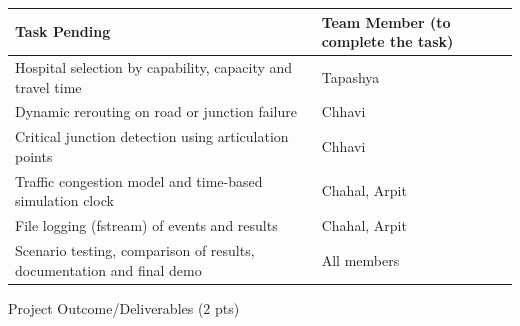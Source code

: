 \documentclass[
]{article}
\newcounter{none} %
\begin{document}
{\def\LTcaptype{none} %
\begin{longtable}[]{@{}
  >{\raggedright\arraybackslash}p{}
  >{\raggedright\arraybackslash}p{}@{}}
\toprule\noalign{}
\begin{minipage}[b]{\linewidth}\raggedright
\textbf{Task Pending}
\end{minipage} & \begin{minipage}[b]{\linewidth}\raggedright
\textbf{Team Member (to complete the task)}
\end{minipage} \\
\midrule\noalign{}
\endhead
\bottomrule\noalign{}
\endlastfoot
Hospital selection by capability, capacity and travel time & Tapashya \\
Dynamic rerouting on road or junction failure & Chhavi \\
Critical junction detection using articulation points & Chhavi \\
Traffic congestion model and time-based simulation clock & Chahal,
Arpit \\
File logging (fstream) of events and results & Chahal, Arpit \\
Scenario testing, comparison of results, documentation and final demo &
All members \\
\end{longtable}
}

Project Outcome/Deliverables (2 pts)
\end{document}
